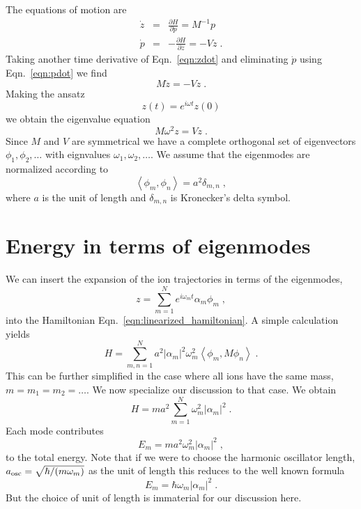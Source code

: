 \documentclass[aps, pra, preprint]{revtex4-1}
\begin{document}
The equations of motion are
\begin{eqnarray}
  \dot{z} &=& \frac{\partial H}{\partial p} = M^{-1}p\label{eqn:zdot}\\
  \dot{p} &=& -\frac{\partial H}{\partial z} = -Vz\label{eqn:pdot}\;.
\end{eqnarray}
Taking another time derivative of Eqn.~\eqref{eqn:zdot} and
eliminating $\dot{p}$ using Eqn.~\eqref{eqn:pdot} we find
\begin{equation}
  M\ddot{z}=-Vz\;.
\end{equation}
Making the ansatz
\begin{equation}
  z(t)=e^{i\omega t}z(0)
\end{equation}
we obtain the eigenvalue equation
\begin{equation}
  M\omega^2z = Vz\;.
\end{equation}
Since $M$ and $V$ are symmetrical we have a complete orthogonal
set of eigenvectors $\phi_1, \phi_2,\ldots$ with eignvalues
$\omega_1, \omega_2, \ldots$. We assume that the eigenmodes are
normalized according to
\begin{equation}
  \left\langle \phi_m,\phi_n\right \rangle = a^2\delta_{m,n}\;,
\end{equation}
where $a$ is the unit of length and $\delta_{m,n}$ is Kronecker's
delta symbol.


\section{Energy in terms of eigenmodes}

We can insert the expansion of the ion trajectories in terms of the
eigenmodes,
\begin{equation}
  z=\sum_{m=1}^N e^{i\omega_m t} \alpha_m \phi_m\;,
\end{equation}
into the Hamiltonian Eqn.~\eqref{eqn:linearized_hamiltonian}. A
simple calculation yields
\begin{equation}
  H=\sum_{m,n=1}^Na^2\left| \alpha_m\right|^2
    \omega_m^2\left\langle \phi_m,M\phi_n \right\rangle\;.
\end{equation}
This can be further simplified in the case where all ions
have the same mass, $m=m_1=m_2=\ldots$. We now specialize our
discussion to that case. We obtain
\begin{equation}
  H=ma^2\sum_{m=1}^N\omega_m^2\left| \alpha_m \right|^2\;.
\end{equation}
Each mode contributes
\begin{equation}
  E_m=ma^2\omega_m^2\left| \alpha_m \right|^2\;,
\end{equation}
to the total energy. Note that if we were to choose the harmonic
oscillator length, $a_{\rm osc}=\sqrt{\hbar/(m\omega_m)}$ as the
unit of length this reduces to the well known formula
\begin{equation}
  E_m=\hbar\omega_m\left| \alpha_m \right|^2\;.
\end{equation}
But the choice of unit of length is immaterial for our discussion
here.
\end{document}
